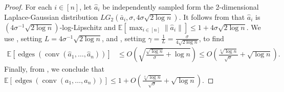 \documentclass{article}\usepackage[a4paper,margin=20mm]{geometry}
\newcommand{\E}{\mathbb E}
\newcommand{\conv}{\operatorname{conv}}
\newcommand{\edges}{\operatorname{edges}}
\begin{document}
\begin{proof}
    For each $i \in [n]$, let $\hat{a}_i$ be independently sampled form the 2-dimensional Laplace-Gaussian distribution $LG_2(\bar{a}_i, \sigma, 4\sigma \sqrt{2\log n})$. It follows from
     that
    $\hat{a}_i$ is $(4\sigma^{-1} \sqrt{2\log n})$-log-Lipschitz
    and $\E[\max_{i \in [n]}\|\hat a_i\|] \leq 1 + 4\sigma\sqrt{2\log n}$.
    We use , setting $L = 4\sigma^{-1} \sqrt{2\log n}$, and
    , setting $\gamma = \frac{1}{L} = \frac{\sigma}{4\sqrt{2\log n}}$, to find
    \begin{align*}
        \E\left[ \edges\left(\conv(\hat{a}_1, \ldots, \hat{a}_n) \right) \right] 
         &\leq O\left(\sqrt{\frac{\sqrt{\log n}}{\sigma} + \log n}\right) \leq  O\left(\frac{\sqrt[4]{\log n}}{\sqrt{\sigma}} + \sqrt{\log n}\right).
    \end{align*}
    Finally, from , we conclude that $
        \E\left[ \edges\left(\conv(a_1, \ldots, a_n) \right) \right] \leq 1 + O(\frac{\sqrt[4]{\log n}}{\sqrt{\sigma}} + \sqrt{\log n}).
    $
\end{proof}
\end{document}
